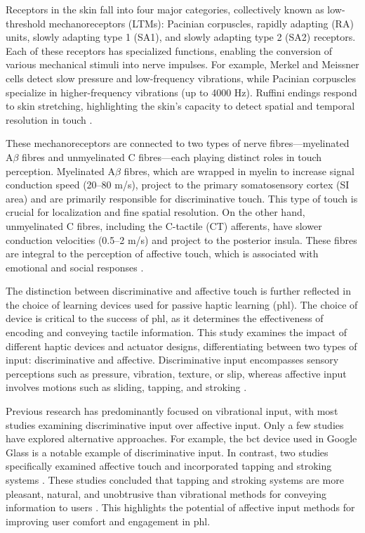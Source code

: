 Receptors in the skin fall into four major categories, collectively known as low-threshold mechanoreceptors (LTMs): Pacinian corpuscles, rapidly adapting (RA) units, slowly adapting type 1 (SA1), and slowly adapting type 2 (SA2) receptors. Each of these receptors has specialized functions, enabling the conversion of various mechanical stimuli into nerve impulses. For example, Merkel and Meissner cells detect slow pressure and low-frequency vibrations, while Pacinian corpuscles specialize in higher-frequency vibrations (up to 4000 Hz). Ruffini endings respond to skin stretching, highlighting the skin's capacity to detect spatial and temporal resolution in touch \cite{Fang2022a, Fang2023, ackerley2016touch, mcglone2014discriminative}.

These mechanoreceptors are connected to two types of nerve fibres—myelinated A$\beta$ fibres and unmyelinated C fibres—each playing distinct roles in touch perception. Myelinated A$\beta$ fibres, which are wrapped in myelin to increase signal conduction speed (20–80 m/s), project to the primary somatosensory cortex (SI area) and are primarily responsible for discriminative touch. This type of touch is crucial for localization and fine spatial resolution. On the other hand, unmyelinated C fibres, including the C-tactile (CT) afferents, have slower conduction velocities (0.5–2 m/s) and project to the posterior insula. These fibres are integral to the perception of affective touch, which is associated with emotional and social responses \cite{Fang2022a, Fang2023, ackerley2016touch, mcglone2014discriminative}.

The distinction between discriminative and affective touch is further reflected in the choice of learning devices used for passive haptic learning (\gls{phl}). The choice of device is critical to the success of \gls{phl}, as it determines the effectiveness of encoding and conveying tactile information. This study examines the impact of different haptic devices and actuator designs, differentiating between two types of input: discriminative and affective. Discriminative input encompasses sensory perceptions such as pressure, vibration, texture, or slip, whereas affective input involves motions such as sliding, tapping, and stroking \cite{Fang2023}.

Previous research has predominantly focused on vibrational input, with most studies examining discriminative input over affective input. Only a few studies have explored alternative approaches. For example, the \gls{bct} device used in Google Glass \cite{Seim2016a} is a notable example of discriminative input. In contrast, two studies specifically examined affective touch and incorporated tapping and stroking systems \cite{Fang2020, Fang2023}. These studies concluded that tapping and stroking systems are more pleasant, natural, and unobtrusive than vibrational methods for conveying information to users \cite{Fang2022a, Fang2023}. This highlights the potential of affective input methods for improving user comfort and engagement in \gls{phl}.

